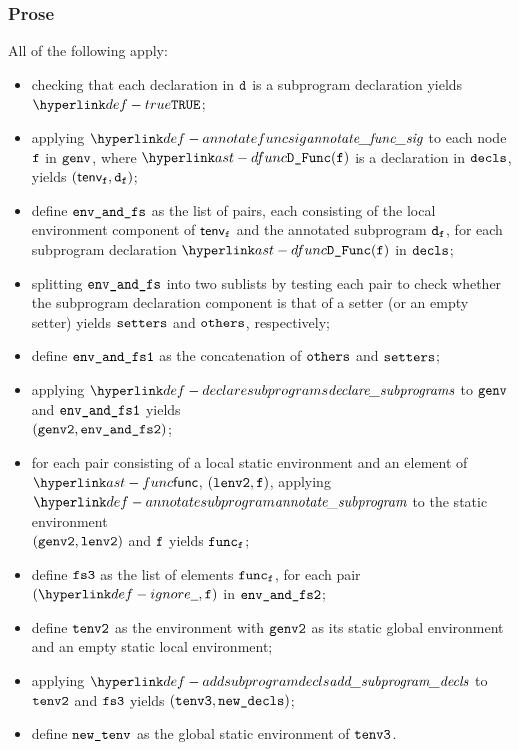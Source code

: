 \subsubsection{Prose}
All of the following apply:
\begin{itemize}
  \item checking that each declaration in $\texttt{d}$ is a subprogram declaration yields $\True$\ProseTerminateAs{\BadRecursiveDecls};
  \item applying $\annotatefuncsig$ to each node $\texttt{f}$ in $\texttt{genv}$, where $\DFunc(\vf)$ is a declaration in $\texttt{decls}$,
        yields $(\textsf{tenv}_{\texttt{f}}, \texttt{d}_{\texttt{f}})$\ProseOrTypeError;
  \item define $\texttt{env\_and\_fs}$ as the list of pairs, each consisting of the local environment component of $\textsf{tenv}_{\texttt{f}}$
        and the annotated subprogram $\texttt{d}_{\texttt{f}}$, for each subprogram declaration $\DFunc(\vf)$ in $\texttt{decls}$;
  \item splitting $\texttt{env\_and\_fs}$ into two sublists by testing each pair to check whether the subprogram declaration
        component is that of a setter (or an empty setter) yields $\texttt{setters}$ and $\texttt{others}$, respectively;
  \item define $\texttt{env\_and\_fs1}$ as the concatenation of $\texttt{others}$ and $\texttt{setters}$;
  \item applying $\declaresubprograms$ to $\texttt{genv}$ and $\texttt{env\_and\_fs1}$ yields \\
        $(\texttt{genv2}, \texttt{env\_and\_fs2})$\ProseOrTypeError;
  \item for each pair consisting of a local static environment and an element of $\func$, $(\texttt{lenv2}, \texttt{f})$,
        applying $\annotatesubprogram$ to the static environment \\
        $(\texttt{genv2}, \texttt{lenv2})$ and $\texttt{f}$ yields $\texttt{func}_{\texttt{f}}$\ProseOrTypeError;
  \item define $\texttt{fs3}$ as the list of elements $\texttt{func}_{\texttt{f}}$, for each pair $(\Ignore, \vf)$ in
        $\texttt{env\_and\_fs2}$;
  \item define $\texttt{tenv2}$ as the environment with $\texttt{genv2}$ as its static global environment
        and an empty static local environment;
  \item applying $\addsubprogramdecls$ to $\texttt{tenv2}$ and $\texttt{fs3}$ yields $(\texttt{tenv3}, \texttt{new\_decls})$;
  \item define $\texttt{new\_tenv}$ as the global static environment of $\texttt{tenv3}$.
\end{itemize}

